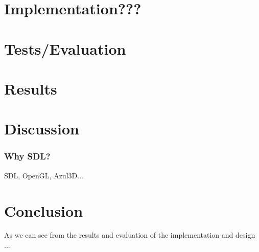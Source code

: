 \documentclass[12pt, a4paper, oneside]{article}
\begin{document}
\section{Implementation???}
\section{Tests/Evaluation}
\section{Results}
\section{Discussion}
\subsubsection{Why SDL?}
SDL, OpenGL, Azul3D...
\section{Conclusion}
As we can see from the results and evaluation of the implementation and design ...


\newpage




\end{document}
